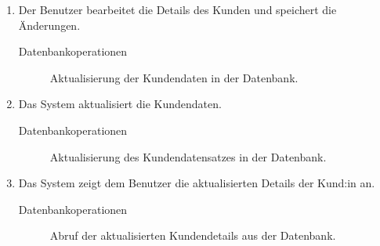 \begin{enumerate}
\begin{description}
        \end{description}
    \item Der Benutzer bearbeitet die Details des Kunden und speichert die Änderungen.
        \begin{description}
            \item[Datenbankoperationen] Aktualisierung der Kundendaten in der Datenbank.                        
        \end{description}
    \item Das System aktualisiert die Kundendaten.
        \begin{description}
            \item[Datenbankoperationen] Aktualisierung des Kundendatensatzes in der
            Datenbank.                        
        \end{description}
    \item Das System zeigt dem Benutzer die aktualisierten Details der Kund:in an.
        \begin{description}
            \item[Datenbankoperationen] Abruf der aktualisierten Kundendetails aus der
            Datenbank.                                    
        \end{description}
\end{enumerate}
